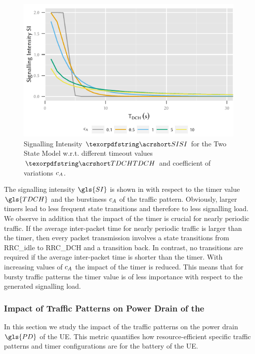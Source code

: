 \begin{figure}
	\centering
	\includegraphics{network/performance_model/numerical_examples/figures/2state_tdch_si}
	\caption{Signalling Intensity \(\headershortacr{SI}\) for the Two State Model w.r.t. different timeout values \(\headershortacr{TDCH}\) and coefficient of variations \(c_{A}\).}
	\label{fig:network:performance_model:numerical_examples:validations:analytic_vs_simulation:2state_tdch_si}
\end{figure}


The signalling intensity \(\gls{SI}\) is shown in  with respect to the timer value \(\gls{TDCH}\) and the burstiness \(c_{A}\) of the traffic pattern.
Obviously, larger timers lead to less frequent state transitions and therefore to less signalling load.
We observe in addition that the impact of the timer is crucial for nearly periodic traffic.
If the average inter-packet time for nearly periodic traffic is larger than the timer, then every packet transmission involves a state transitions from \gls{RRC_idle} to \gls{RRC_DCH} and a transition back.
In contrast, no transitions are required if the average inter-packet time is shorter than the timer.
With increasing values of \(c_{A}\) the impact of the timer is reduced.
This means that for bursty traffic patterns the timer value is of less importance with respect to the generated signalling load.

\subsubsection*{Impact of Traffic Patterns on Power Drain of the }\label{sec:network:performance_model:power_drain}
In this section we study the impact of the traffic patterns on the power drain \(\gls{PD}\) of the \gls{UE}.
This metric quantifies how resource-efficient specific traffic patterns and timer configurations are for the battery of the \gls{UE}.

